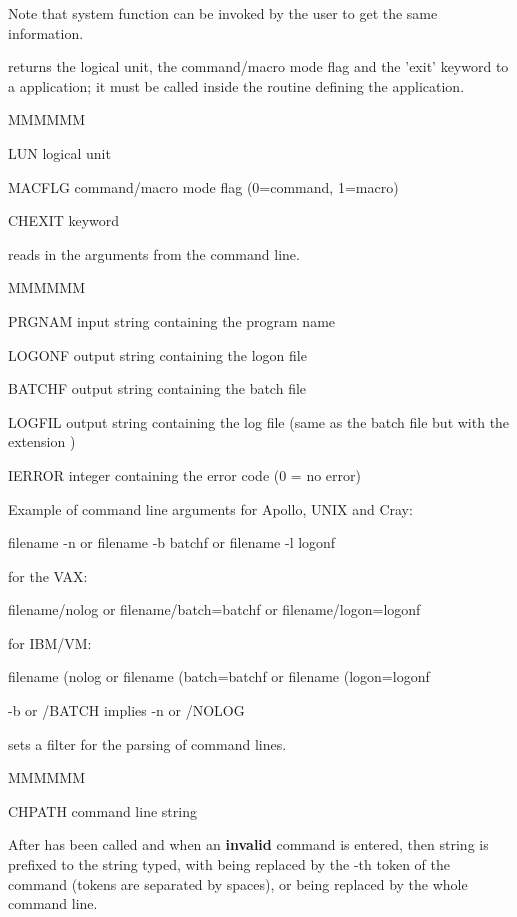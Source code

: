 Note that system function  can be invoked
by the user to get the same information.

\Vskip{}
\Action returns the logical unit, the command/macro mode flag and
the 'exit' keyword to a \KUIP{} application; it must be called
inside the routine defining the \KUIP{} application.
\condbreak{2cm}
\Pdesc\begin{DLtt}{MMMMMM}
\item[LUN] logical unit
\item[MACFLG] command/macro mode flag (0=command, 1=macro)
\item[CHEXIT]  keyword
\end{DLtt}


\Action reads in the arguments from the command line.
\Pdesc\begin{DLtt}{MMMMMM}
\item[PRGNAM] input string containing the program name
\item[LOGONF] output string containing the logon file
\item[BATCHF] output string containing the batch file
\item[LOGFIL] output string containing the log file
(same as the batch file but with the extension )
\item[IERROR] integer containing the error code (0 = no error)
\end{DLtt}
\begin{XMPt}{Example of command line arguments}
{\rm for Apollo, UNIX and Cray:}
             
  filename -n    {\rm or }   filename -b batchf   {\rm or}  filename -l logonf
           
{\rm for the VAX:}
            
  filename/nolog   {\rm or }   filename/batch=batchf   {\rm or}
  filename/logon=logonf
           
{\rm for IBM/VM:}
            
  filename (nolog  {\rm or }   filename (batch=batchf  {\rm or}
  filename (logon=logonf

-b {\rm or} /BATCH {\rm implies} -n {\rm or} /NOLOG
\end{XMPt}                         


\Action sets a filter for the parsing of command lines.
\Pdesc\begin{DLtt}{MMMMMM}
\item[CHPATH] command line string
\end{DLtt}
\Remark
After  has been called and when an {\bf invalid} command is entered,
then string  is prefixed to the string typed,
with  being replaced
by the -th token of the command (tokens are separated by spaces),
or \Lit{\$*} being replaced by the whole command line.

